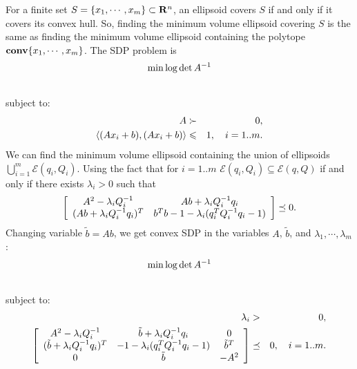 \documentclass[letterpaper,10pt,english]{sphinxmanual}
\begin{document}
For a finite set $S=\{x_1,\cdots,x_m\}\subset{\bf R}^n$, an
ellipsoid covers $S$ if and only if it covers its convex hull. So,
finding the minimum volume ellipsoid covering $S$ is the same as
finding the minimum volume ellipsoid containing the polytope
${\bf conv}\{x_1,\cdots,x_m\}$. The SDP problem is
\begin{gather}
\begin{split}\min \log \det A^{-1}\end{split}\notag\\\begin{split}\end{split}\notag
\end{gather}
subject to:
\begin{gather}
\begin{split}\begin{aligned}
A & \succ & 0, \\
\langle (Ax_i + b), (Ax_i + b)\rangle & \leqslant& 1, ~~~ i=1..m.\end{aligned}\end{split}\notag
\end{gather}
We can find the minimum volume ellipsoid containing the union of
ellipsoids $\bigcup_{i=1}^m{\mathcal E}(q_i,Q_i)$. Using the fact
that for $i=1..m$
${\mathcal E}(q_i,Q_i)\subseteq{\mathcal E}(q,Q)$ if and only if
there exists $\lambda_i>0$ such that
\begin{gather}
\begin{split}\left[\begin{array}{cc}
A^2 - \lambda_i Q_i^{-1} & Ab + \lambda_i Q_i^{-1}q_i\\
(Ab + \lambda_i Q_i^{-1}q_i)^T & b^Tb-1 - \lambda_i (q_i^TQ_i^{-1}q_i-1) \end{array}
\right] \preceq 0 .\end{split}\notag
\end{gather}
Changing variable $\tilde{b}=Ab$, we get convex SDP in the
variables $A$, $\tilde{b}$, and
$\lambda_1,\cdots,\lambda_m$:
\begin{gather}
\begin{split}\min \log \det A^{-1}\end{split}\notag\\\begin{split}\end{split}\notag
\end{gather}
subject to:
\begin{gather}
\begin{split}\begin{aligned}
\lambda_i & > & 0,\\
\left[\begin{array}{ccc}
A^2-\lambda_iQ_i^{-1} & \tilde{b}+\lambda_iQ_i^{-1}q_i & 0 \\
(\tilde{b}+\lambda_iQ_i^{-1}q_i)^T & -1-\lambda_i(q_i^TQ_i^{-1}q_i-1) & \tilde{b}^T \\
0 & \tilde{b} & -A^2\end{array}\right] & \preceq & 0, ~~~ i=1..m.\end{aligned}\end{split}\notag
\end{gather}
\end{document}
